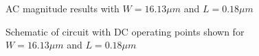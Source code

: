 \documentclass[12pt, letterpaper, notitlepage, DIV=16, BCOR=1mm, headlines=2]{scrreprt}
\begin{document}
\begin{figure}[h]
	\caption{AC magnitude results with $W=16.13\mu m$ and $L=0.18\mu m$}
	\label{fig:ACmag1}
\end{figure}
\begin{figure}[h]
	\caption{Schematic of circuit with DC operating points shown for $W=16.13\mu m$ and $L=0.18\mu m$}
	\label{fig:schematicA}
\end{figure}

\end{document}
